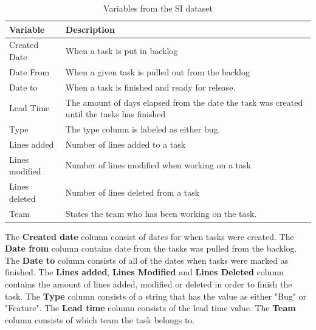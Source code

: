 \documentclass[UKenglish]{ifimaster}  %
\begin{document}
\begin{table}[!ht]
\begin{center}
    \begin{tabular}{| l | p{5cm} |}
    \hline
     \bf{Variable} & \bf{Description}\\ \hline
     Created Date & When a task is put in backlog \\ \hline
     Date From & When a given task is pulled out from the backlog\\ \hline
     Date to & When a task is finished and ready for release. \\ \hline
    Lead Time & The amount of days elapsed from the date the task was created until the tasks has finished  \\ \hline
   Type & The type column is labeled as either bug. \\ \hline
   Lines added & Number of lines added to a task \\ \hline
   Lines modified & Number of lines modified when working on a task \\ \hline
   Lines deleted & Number of lines deleted from a task \\
    \hline
    Team &States the team who has been working on the task.\\ \hline
    \end{tabular}
\caption{Variables from the SI dataset}
\label{IC} %
\end{center}
\end{table}

\newpage
The \textbf{Created date} column consist of dates for when tasks were created. 
The \textbf{Date from} column contains date from the tasks was pulled from the backlog. 
The \textbf{Date to} column consists of all of the dates when tasks were marked as finished.
The \textbf{Lines added}, \textbf{Lines Modified} and \textbf{Lines Deleted} column contains the amount of lines added, modified or deleted in order to finish the task.
The \textbf{Type} column consists of a string that has the value as either "Bug" or "Feature".
The \textbf{Lead time} column consists of the lead time value. 
The \textbf{Team} column consists of which team the task belongs to. 
\end{document}
